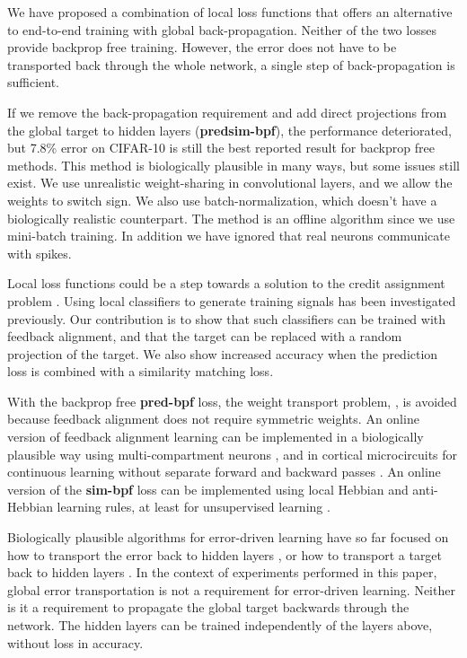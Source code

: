 \documentclass{article}
\begin{document}
We have proposed a combination of local loss functions that offers an alternative to end-to-end training with global back-propagation. Neither of the two losses provide backprop free training. However, the error does not have to be transported back through the whole network, a single step of back-propagation is sufficient. 

If we remove the back-propagation requirement and add direct projections from the global target to hidden layers (\textbf{predsim-bpf}), the performance deteriorated, but 7.8\% error on CIFAR-10 is still the best reported result for backprop free methods. This method is biologically plausible in many ways, but some issues still exist. We use unrealistic weight-sharing in convolutional layers, and we allow the weights to switch sign. We also use batch-normalization, which doesn't have a biologically realistic counterpart. The method is an offline algorithm since we use mini-batch training. In addition we have ignored that real neurons communicate with spikes.

Local loss functions could be a step towards a solution to the credit assignment problem \cite{BengioLBL15}. Using local classifiers to generate training signals has been investigated previously. Our contribution is to show that such classifiers can be trained with feedback alignment, and that the target can be replaced with a random projection of the target. We also show increased accuracy when the prediction loss is combined with a similarity matching loss.

With the backprop free \textbf{pred-bpf} loss, the weight transport problem, \cite{Grossberg87}, is avoided because feedback alignment does not  require symmetric weights. An online version of feedback alignment learning can be implemented in a biologically plausible way using multi-compartment neurons \cite{GuerguievLR17}, and in cortical microcircuits for continuous learning without separate forward and backward passes \cite{Sacramento18}. An online version of the \textbf{sim-bpf} loss can be implemented using local Hebbian and anti-Hebbian learning rules, at least for unsupervised learning \cite{Pehlevan2014hebbian,PehlevanSC18, GiovannucciMPC18}. 

Biologically plausible algorithms for error-driven learning have so far focused on how to transport the error back to hidden layers \cite{LillicrapCTA14,Nokland16}, or how to transport a target back to hidden layers \cite{XieS03,Bengio14,LeeZFB15,ScellierB17,WhittingtonB17}. In the context of experiments performed in this paper, global error transportation is not a requirement for error-driven learning. Neither is it a requirement to propagate the global target backwards through the network. The hidden layers can be trained independently of the layers above, without loss in accuracy.
\end{document}
